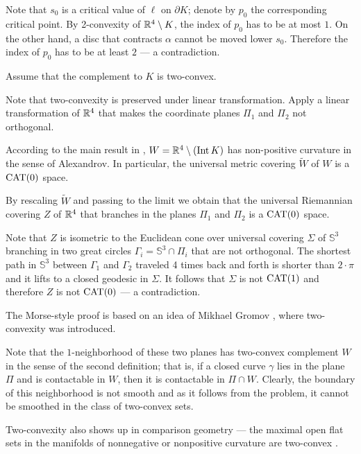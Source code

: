 Note that $s_0$ is a critical value of $\ell$ on $\partial K$;
denote by $p_0$ the corresponding critical point.
By 2-convexity of $\mathbb{R}^4\setminus K$,
the index of $p_0$ has to be at most $1$.
On the other hand, a disc that contracts $\alpha$ cannot be moved lower $s_0$.
Therefore the index of $p_0$ has to be at least $2$ --- a contradiction.
\qeds

Assume that the complement to $K$ is two-convex.

Note that two-convexity is preserved under linear transformation.
Apply a linear transformation of $\mathbb{R}^4$ that makes the coordinate planes $\Pi_1$ and $\Pi_2$ not orthogonal.

According to the main result in \cite{ABB}, $W\z=\RR^4\setminus (\Int K)$ has non-positive curvature in the sense of Alexandrov.
In particular, the universal metric covering $\tilde W$ of $W$ is a $\operatorname{\rm CAT}\nolimits(0)$ space.

By rescaling $\tilde W$ and passing to the limit we obtain that the universal Riemannian covering $Z$ of $\mathbb{R}^4$ that branches in the planes $\Pi_1$ and $\Pi_2$ is a $\operatorname{\rm CAT}\nolimits(0)$ space.

Note that $Z$ is isometric to the Euclidean cone over universal covering $\Sigma$ of $\mathbb{S}^3$ branching in two great circles $\Gamma_i=\mathbb{S}^3\cap \Pi_i$ that are not orthogonal.
The shortest path in $\mathbb{S}^3$ between $\Gamma_1$ and $\Gamma_2$ traveled 4 times back and forth is shorter than $2\cdot\pi$ and it lifts to a closed geodesic in $\Sigma$.
It follows that $\Sigma$ is not $\operatorname{\rm CAT}\nolimits(1)$ and therefore $Z$ is not $\operatorname{\rm CAT}\nolimits(0)$ --- a contradiction.\qeds

The Morse-style proof is based on an idea of Mikhael Gromov \cite[see \S\textonehalf{} in][]{gromov-SGMC}, where two-convexity was introduced.

Note that the $1$-neighborhood of these two planes has two-convex complement $W$ in the sense of the second definition;
that is, if a closed curve $\gamma$ lies in the plane $\Pi$
and is contactable in $W$, then it is contactable in $\Pi\cap W$.
Clearly, the boundary of this neighborhood is not smooth
and as it follows from the problem, it cannot be smoothed in the class of two-convex sets. 

Two-convexity also shows up in comparison geometry --- the maximal open flat sets in the manifolds of nonnegative or nonpositive curvature are two-convex \cite{panov-petrunin}.


